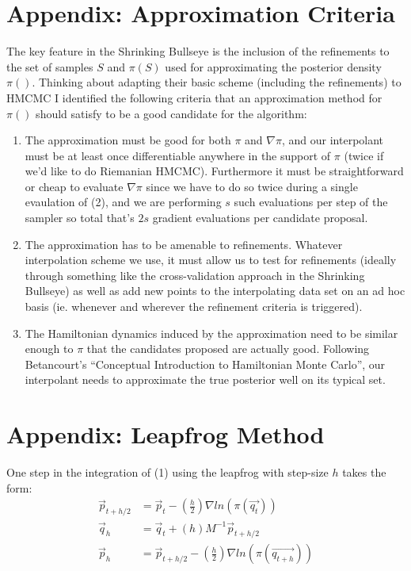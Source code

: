 \documentclass[12pt,a4paper]{article}
\begin{document}
\section{Appendix: Approximation Criteria}
The key feature in the Shrinking Bullseye is the inclusion of the refinements to the set of samples $S$ and $\pi(S)$ used for approximating the posterior density $\pi()$.  Thinking about adapting their basic scheme (including the refinements) to HMCMC I identified the following criteria that an approximation method for $\pi()$ should satisfy to be a good candidate for the algorithm:
\begin{enumerate}
\item The approximation must be good for both $\pi$ and $\nabla \pi$, and our interpolant must be at least once differentiable anywhere in the support of $\pi$ (twice if we’d like to do Riemanian HMCMC). Furthermore it must be straightforward or cheap to evaluate $\nabla \pi$ since we have to do so twice during a single evaulation of (2), and we are performing $s$ such evaluations per step of the sampler so total that’s $2s$ gradient evaluations per candidate proposal.
\item The approximation has to be amenable to refinements. Whatever interpolation scheme  we use, it must allow us to test for refinements (ideally through something like the cross-validation approach in the Shrinking Bullseye) as well as add new points to the interpolating data set on an ad hoc basis (ie. whenever and wherever the refinement criteria is triggered).
\item  The Hamiltonian dynamics induced by the approximation  need to be similar enough to $\pi$ that the candidates proposed are actually good. Following Betancourt’s “Conceptual Introduction to Hamiltonian Monte Carlo”, our interpolant needs to approximate the true posterior well on its typical set.
\end{enumerate}

\section{Appendix: Leapfrog Method}
One step in the integration of (1) using the leapfrog with step-size $h$ takes the form:
\begin{equation}
\begin{split}
\vec{p}_{t+h/2} &= \vec{p}_t - (\frac{h}{2})  \nabla ln(\pi(\vec{q_t}))\\
\vec{q}_h &= \vec{q}_t + (h)M^{-1} \vec{p}_{t+h/2} \\ 
\vec{p}_h &= \vec{p}_{t+h/2} - (\frac{h}{2})  \nabla ln(\pi(\vec{q_{t+h}})) \\
\end{split}
\end{equation}

\printbibliography
\end{document}
